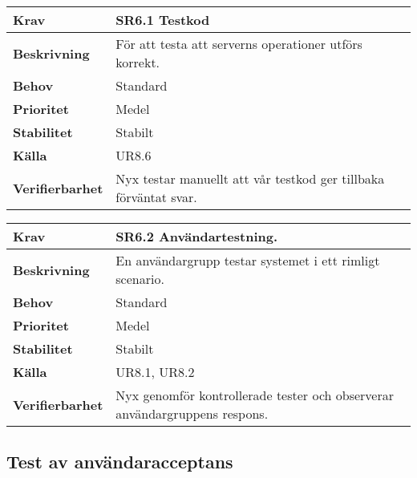 \documentclass[a4paper, twoside, 11pt, titlepage]{article}
\begin{document}
	\begin {table} [ht] \begin{tabular} { p{2.6cm} p{12.5cm} }
		\hline
		\sffamily\textbf{Krav} & \sffamily\textbf{SR6.1 Testkod } \\
		\hline
		\sffamily\textbf{Beskrivning} &  För att testa att serverns operationer utförs korrekt.  \\
		\hline
		\sffamily\textbf{Behov} & Standard  \\
		\hline
		\sffamily\textbf{Prioritet} & Medel  \\
		\hline
		\sffamily\textbf{Stabilitet} & Stabilt  \\
		\hline
		\sffamily\textbf{Källa} & UR8.6  \\
		\hline
		\sffamily\textbf{Verifierbarhet} &  Nyx testar manuellt att vår testkod ger tillbaka förväntat svar.  \\
		\hline
	\end{tabular} \end{table} \FloatBarrier
	\vspace{6mm}

	\begin {table} [ht] \begin{tabular} { p{2.6cm} p{12.5cm} }
		\hline
		\sffamily\textbf{Krav} & \sffamily\textbf{SR6.2 Användartestning. } \\
		\hline
		\sffamily\textbf{Beskrivning} & En användargrupp testar systemet i ett rimligt scenario.  \\
		\hline
		\sffamily\textbf{Behov} & Standard  \\
		\hline
		\sffamily\textbf{Prioritet} & Medel  \\
		\hline
		\sffamily\textbf{Stabilitet} & Stabilt  \\
		\hline
		\sffamily\textbf{Källa} & UR8.1, UR8.2  \\
		\hline
		\sffamily\textbf{Verifierbarhet} & Nyx genomför kontrollerade tester och observerar användargruppens respons.  \\
		\hline
	\end{tabular} \end{table} \FloatBarrier


	\subsection{Test av användaracceptans}
\end{document}
